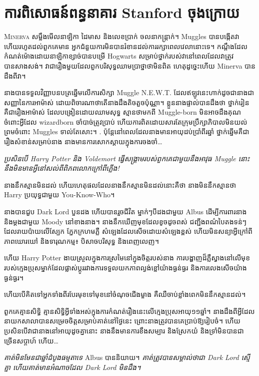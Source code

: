 \chapter{ការពិសោធន៍ពន្ធនាគារ Stanford ចុងក្រោយ}

\lettrine{M}{inerva} សម្លឹងមើលនាឡិកា ដៃមាស និងលេខប្រាក់ ចលនាកន្ត្រាក់។ Muggles បានបង្កើតវា ហើយរហូតដល់ពួកគេមាន អ្នកជំនួយការមិនបានរំខានដល់ការរក្សាពេលវេលានោះទេ។ កណ្តឹងដែលកំណត់ម៉ោងដោយនាឡិកាខ្សាច់បានបម្រើ Hogwarts សម្រាប់ថ្នាក់របស់វានៅពេលដែលវាត្រូវបានសាងសង់។ វាជារឿងមួយដែលពួកបរិសុទ្ធឈាមប្រាថ្នាថាមិនពិត ហេតុដូច្នេះហើយ Minerva បានដឹងពីវា។

នាងបានទទួលវិញ្ញាបនបត្រឆ្នើមលើការសិក្សា Muggle N.E.W.T. ដែលឥឡូវនេះហាក់ដូចជានាងជាសញ្ញានៃការអាម៉ាស់ ដោយពិចារណាថាតើនាងដឹងតិចតួចប៉ុណ្ណា។ ខ្លួននាងផ្ទាល់បានដឹងថា ថ្នាក់រៀនគឺជារឿងអាម៉ាស់ ដែលបង្រៀនដោយឈាមសុទ្ធ ស្មានថាមកពី Muggle-born មិនអាចដឹងគុណចំពោះអ្វីដែល wizardborn ចាំបាច់ត្រូវប្រាប់ ហើយការពិតដោយសារតែក្រុមប្រឹក្សាភិបាលមិនយល់ព្រមចំពោះ Muggles ទាល់តែសោះ។ . ប៉ុន្តែនៅពេលដែលនាងមានអាយុដប់ប្រាំពីរឆ្នាំ ថ្នាក់ឆ្នើមគឺជារឿងសំខាន់សម្រាប់នាង នាងមានការសោកស្ដាយក្នុងការចងចាំ…

\emph{ប្រសិនបើ Harry Potter និង Voldemort ធ្វើសង្គ្រាមរបស់ពួកគេជាមួយនឹងអាវុធ Muggle នោះនឹងមិនមានអ្វីនៅសល់ពីពិភពលោកក្រៅពីភ្លើង!}

នាងនឹកស្មានមិនដល់ ហើយហេតុផលដែលនាងនឹកស្មានមិនដល់នោះគឺថា នាងមិននឹកស្មានថា Harry ប្រយុទ្ធជាមួយ You-Know-Who។

នាងបានជួប Dark Lord បួនដង ហើយបានរួចជីវិត ម្នាក់ៗបីដងជាមួយ Albus ដើម្បីការពារនាង និងម្តងជាមួយ Moody នៅខាងនាង។ នាងនឹកឃើញមុខដែលខូចដូចពស់ ជញ្ជីងពណ៌បៃតងទន់ៗដែលរាយប៉ាយលើស្បែក ភ្នែកក្រហមភ្លឺ សំឡេងដែលសើចដោយសំឡេងខ្ពស់ ហើយមិនសន្យាអ្វីក្រៅពីភាពឃោរឃៅ និងទារុណកម្ម៖ បិសាចបរិសុទ្ធ និងពេញលេញ។

ហើយ Harry Potter ងាយស្រួលក្នុងការស្រមៃនៅក្នុងចិត្តរបស់នាង ការបង្ហាញដ៏ភ្លឺស្វាងនៅលើមុខរបស់ក្មេងប្រុសម្នាក់ដែលផ្លាស់ប្តូររវាងការទទួលយកភាពល្ងង់ខ្លៅយ៉ាងធ្ងន់ធ្ងរ និងការលេងសើចយ៉ាងធ្ងន់ធ្ងរ។

ហើយ​បើ​គិត​ទៅ​អ្នក​ទាំង​ពីរ​បែរ​មុខ​ទៅ​មុខ​នៅ​ចំណុច​ជើង​ម្ខាង គឺ​ឈឺ​ចាប់​ខ្លាំង​ពេក​មិន​នឹក​ស្មាន​ដល់។

ពួក​គេ​គ្មាន​សិទ្ធិ គ្មាន​សិទ្ធិ​អ្វី​ទាំង​អស់​ក្នុង​ការ​កំណត់​រឿង​នេះ​លើ​ក្មេង​ប្រុស​អាយុ​១១​ឆ្នាំ។ នាងដឹងពីអ្វីដែលនាយកសាលាបានសម្រេចចិត្តសម្រាប់គាត់នៅថ្ងៃនេះ ព្រោះនាងត្រូវបានគេប្រាប់ឱ្យរៀបចំ។ ហើយប្រសិនបើវាជានាងនៅអាយុដូចគ្នានោះ នាងនឹងមានការខឹងសម្បារ និងស្រែកយំ និងទ្រាំមិនបានជាច្រើនសប្តាហ៍ ហើយ…

\emph{គាត់មិនមែនជាឆ្នាំដំបូងធម្មតាទេ} Albus បាននិយាយ។ \emph{គាត់ត្រូវបានសម្គាល់ថាជា Dark Lord ស្មើគ្នា ហើយគាត់មានអំណាចដែល Dark Lord មិនដឹង។}

